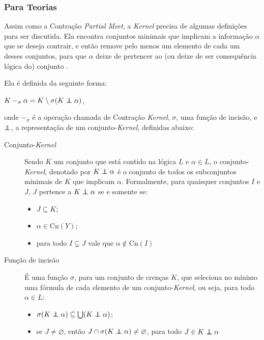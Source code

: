 \subsubsection{Para Teorias}

Assim como a Contração \textit{Partial Meet}, a \textit{Kernel} precisa de algumas definições para ser discutida. Ela encontra conjuntos minimais que implicam a informação $ \alpha $ que se deseja contrair, e então remove pelo menos um elemento de cada um desses conjuntos, para que $ \alpha $ deixe de pertencer ao (ou deixe de ser consequência lógica do) conjunto \citep{revisaoCobe}. 

Ela é definida da seguinte forma:

\begin{center}
	$ K -_{\sigma} \alpha = K \setminus \sigma(K \kcont \alpha) $,
\end{center}

onde $ -_{\sigma} $ é a operação chamada de Contração \textit{Kernel}, $ \sigma $, uma função de incisão, e $ \kcont $, a representação de um conjunto-\textit{Kernel}, definidas abaixo:

\begin{description}
	\item[Conjunto-\textit{Kernel}] Sendo $ K $ um conjunto que está contido na lógica $ L $ e $ \alpha \in L $, o conjunto-\textit{Kernel}, denotado por $ K \kcont \alpha $ é o conjunto de todos os subconjuntos minimais de $ K $ que implicam $ \alpha $. Formalmente, para quaisquer conjuntos $ I $ e $ J $, $ J $ pertence a $ K \kcont \alpha $ se e somente se:
	\begin{itemize}
		\item $ J \subseteq K $;
		\item $ \alpha \in \text{Cn}(Y) $;
		\item para todo $ I \subsetneq J $ vale que $ \alpha \notin \text{Cn}(I) $
	\end{itemize} 	
	\item[Função de incisão] É uma função $ \sigma $, para um conjunto de crenças $ K $, que seleciona no mínimo uma fórmula de cada elemento de um conjunto-\textit{Kernel}, ou seja, para todo $ \alpha \in L $:
	\begin{itemize}
		\item $ \sigma (K \kcont \alpha) \subseteq \bigcup(K \kcont \alpha) $;
		\item se $ J \neq \varnothing $, então $ J \cap \sigma(K \kcont \alpha) \neq \varnothing $, para todo $ J \in K \kcont \alpha $
	\end{itemize}
\end{description}

